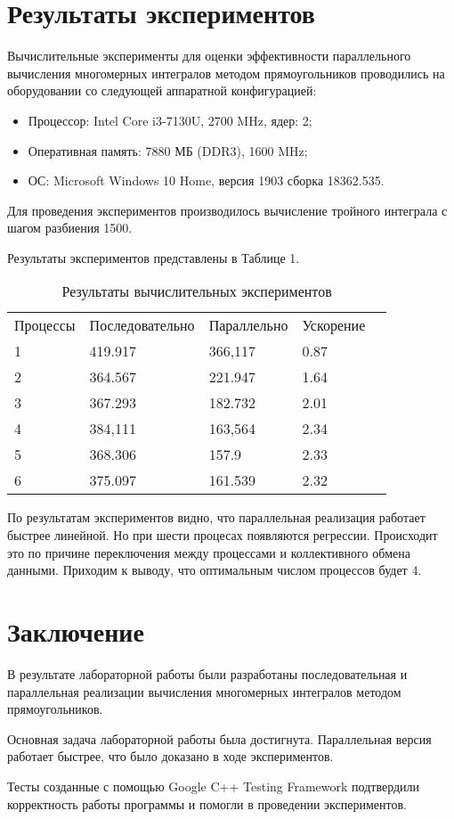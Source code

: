 \documentclass{report}
\begin{document}
\section*{Результаты экспериментов}
Вычислительные эксперименты для оценки эффективности параллельного вычисления многомерных интегралов методом прямоугольников проводились на оборудовании со следующей аппаратной конфигурацией:

\begin{itemize}
\item Процессор: Intel Core i3-7130U, 2700 MHz, ядер: 2;
\item Оперативная память: 7880 МБ (DDR3), 1600 MHz;
\item ОС: Microsoft Windows 10 Home, версия 1903 сборка 18362.535.
\end{itemize}

\par Для проведения экспериментов производилось вычисление тройного интеграла с шагом разбиения 1500.
\par Результаты экспериментов представлены в Таблице 1.

\begin{table}[!h]
\caption{Результаты вычислительных экспериментов}
\centering
\begin{tabular}{lllll}
Процессы & Последовательно & Параллельно & Ускорение  \\
1        & 419.917          & 366,117     & 0.87       \\
2        & 364.567         & 221.947     & 1.64       \\
3        & 367.293         & 182.732     & 2.01       \\
4        & 384,111         & 163,564     & 2.34       \\
5        & 368.306         & 157.9     & 2.33       \\
6        & 375.097         & 161.539     & 2.32
\end{tabular}
\end{table}

\par По результатам экспериментов видно, что параллельная реализация работает быстрее линейной. Но при шести процесах появляются регрессии. Происходит это по причине переключения между процессами и коллективного обмена данными. Приходим к выводу, что оптимальным числом процессов будет 4.
\newpage

\section*{Заключение}
В результате лабораторной работы были разработаны последовательная и параллельная реализации вычисления многомерных интегралов методом прямоугольников.
\par Основная задача лабораторной работы была достигнута. Параллельная версия работает быстрее, что было доказано в ходе экспериментов.
\par Тесты созданные с помощью Google C++ Testing Framework подтвердили корректность работы программы и помогли в проведении экспериментов.
\newpage
\end{document}
